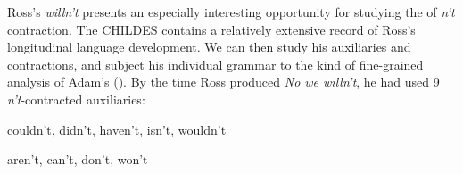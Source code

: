 \documentclass[output=paper,
modfonts
]{LSP/langsci}
\begin{document}

Ross's \textit{willn't} presents an especially interesting opportunity
for studying the  of \textit{n't} 
contraction. The CHILDES  
 contains a relatively extensive record of Ross's longitudinal
 language development. We can then study his auxiliaries and
 contractions, and subject his individual grammar to the kind of fine-grained analysis of Adam's  (). By the
 time Ross produced \emph{No we willn't}, he had used 9 \textit{n't}-contracted auxiliaries:
\begin{exe} \ex \label{Ross}
\begin{xlist} 
\item couldn't, didn't, haven't, isn't, wouldn't \label{rossa}
\item aren't, can't, don't, won't \label{rossb} \end{xlist} \end{exe}
\end{document}
